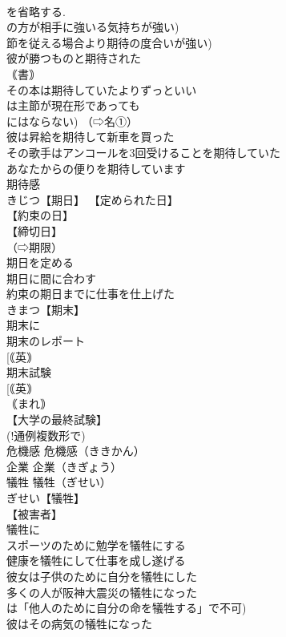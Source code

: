 \documentclass[8pt]{extreport}
\begin{document}
\begin{CJK}{UTF8}{min}
\\	を省略する. 
\\	の方が相手に強いる気持ちが強い) 
\\	節を従える場合より期待の度合いが強い) 
\\	彼が勝つものと期待された 
\\	｟書｠ 
\\	その本は期待していたよりずっといい 
\\	は主節が現在形であっても 
\\	にはならない) （⇨名①） 
\\	彼は昇給を期待して新車を買った 
\\	その歌手はアンコールを3回受けることを期待していた 
\\	あなたからの便りを期待しています 
\\	期待感 
\\	きじつ【期日】 【定められた日】
\\	【約束の日】
\\	【締切日】
\\	（⇨期限） 
\\	期日を定める 
\\	期日に間に合わす 
\\	約束の期日までに仕事を仕上げた 
\\	きまつ【期末】 
\\	期末に 
\\	期末のレポート 
\\	[｟英｠ 
\\	期末試験 
\\	[｟英｠ 
\\	｟まれ｠ 
\\	【大学の最終試験】
\\	(!通例複数形で) 
\\	危機感		危機感（ききかん） 
\\	企業		企業（きぎょう） 
\\	犠牲		犠牲（ぎせい） 
\\	ぎせい【犠牲】 
\\	【被害者】
\\	犠牲に 
\\	スポーツのために勉学を犠牲にする 
\\	健康を犠牲にして仕事を成し遂げる 
\\	彼女は子供のために自分を犠牲にした 
\\	多くの人が阪神大震災の犠牲になった 
\\	は「他人のために自分の命を犠牲する」で不可) 
\\	彼はその病気の犠牲になった 

\end{CJK}
\end{document}
